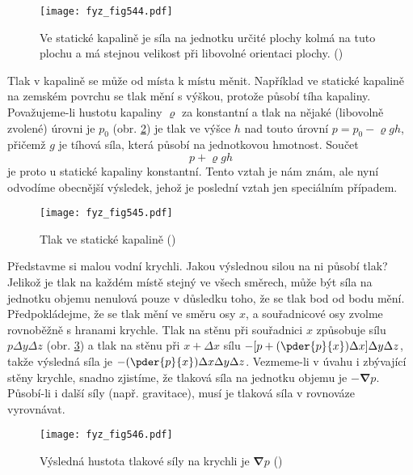     \begin{figure}[ht!] %
      \centering
      \texttt{[image: fyz\_fig544.pdf]}
      \caption{Ve statické kapalině je síla na jednotku určité plochy kolmá na tuto plochu a má 
               stejnou velikost při libovolné orientaci plochy. 
               (\cite[s.~741]{Feynman02})}
      \label{fyz:fig544}
    \end{figure}

    Tlak v kapalině se může od místa k místu měnit. Například ve statické kapalině na zemském 
    povrchu se tlak mění s výškou, protože působí tíha kapaliny. Považujeme-li hustotu kapaliny 
    \(\varrho\) za konstantní a tlak na nějaké (libovolně zvolené) úrovni je \(p_0\) (obr. 
    \ref{fyz:fig545}) je tlak ve výšce \(h\) nad touto úrovní \(p=p_0 - \varrho gh\), přičemž \(g\) 
    je tíhová síla, která působí na jednotkovou hmotnost. Součet
    \begin{equation*}
      p + \varrho gh
    \end{equation*}
    je proto u statické kapaliny konstantní. Tento vztah je nám znám, ale nyní odvodíme obecnější 
    výsledek, jehož je poslední vztah jen speciálním případem.
    
    \begin{figure}[ht!] %
      \centering
      \texttt{[image: fyz\_fig545.pdf]}
      \caption{Tlak ve statické kapalině
               (\cite[s.~741]{Feynman02})}
      \label{fyz:fig545}
    \end{figure}
    
    Představme si malou vodní krychli. Jakou výslednou silou na ni působí tlak? Jelikož je tlak na 
    každém místě stejný ve všech směrech, může být síla na jednotku objemu nenulová pouze v 
    důsledku toho, že se tlak bod od bodu mění. Předpokládejme, že se tlak mění ve směru osy \(x\), 
    a souřadnicové osy zvolme rovnoběžně s hranami krychle. Tlak na stěnu při souřadnici \(x\) 
    způsobuje sílu \(p\Delta y\Delta z\) (obr. \ref{fyz:fig546}) a tlak na stěnu při \(x + \Delta 
    x\) sílu \(-[p + (\pder{p}{x})\Delta x]\Delta y \Delta z\), takže výsledná síla je 
    \(-(\pder{p}{x})\Delta x\Delta y\Delta z\). Vezmeme-li v úvahu i zbývající stěny krychle, 
    snadno zjistíme, že tlaková síla na jednotku objemu je \(-\symbf{\nabla}p\). Působí-li i další 
    síly (např. gravitace), musí je tlaková síla v rovnováze vyrovnávat.

    \begin{figure}[ht!] %
      \centering
      \texttt{[image: fyz\_fig546.pdf]}
      \caption{Výsledná hustota tlakové síly na krychli je \(\symbf{\nabla} p\)
               (\cite[s.~742]{Feynman02})}
      \label{fyz:fig546}
    \end{figure}
    
